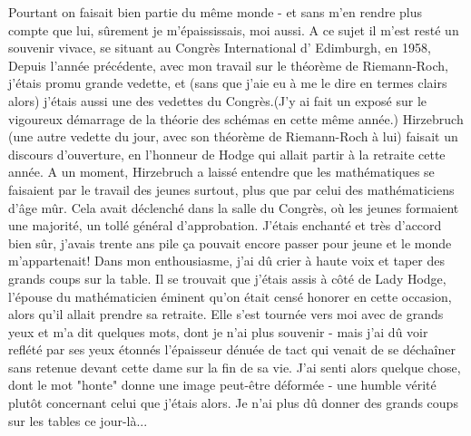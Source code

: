 Pourtant on faisait bien partie du même monde - et sans m'en rendre plus compte que lui, sûrement je m'épaississais, moi aussi. A ce sujet il m'est resté un souvenir vivace, se situant au Congrès International d' Edimburgh, en 1958, Depuis l'année précédente, avec mon travail sur le théorème de Riemann-Roch, j'étais promu grande vedette, et (sans que j'aie eu à me le dire en termes clairs alors) j'étais aussi une des vedettes du Congrès.(J'y ai fait un exposé sur le vigoureux démarrage de la théorie des schémas en cette même année.) Hirzebruch (une autre vedette du jour, avec son théorème de Riemann-Roch à lui) faisait un discours d'ouverture, en l'honneur de Hodge qui allait partir à la retraite cette année. A un moment, Hirzebruch a laissé entendre que les mathématiques se faisaient par le travail des jeunes surtout, plus que par celui des mathématiciens d'âge mûr. Cela avait déclenché dans la salle du Congrès, où les jeunes formaient une majorité, un tollé général d'approbation. J'étais enchanté et très d'accord bien sûr, j'avais trente ans pile ça pouvait encore passer pour jeune et le monde m'appartenait! Dans mon enthousiasme, j'ai dû crier à haute voix et taper des grands coups sur la table. Il se trouvait que j'étais assis à côté de Lady Hodge, l'épouse du mathématicien éminent qu'on était censé honorer en cette occasion, alors qu'il allait prendre sa retraite. Elle s'est tournée vers moi avec de grands yeux et m'a dit quelques mots, dont je n'ai plus souvenir - mais j'ai dû voir reflété par ses yeux étonnés l'épaisseur dénuée de tact qui venait de se déchaîner sans retenue devant cette dame sur la fin de sa vie. J'ai senti alors quelque chose, dont le mot "honte" donne une image peut-être déformée - une humble vérité plutôt concernant celui que j'étais alors. Je n'ai plus dû donner des grands coups sur les tables ce jour-là...




